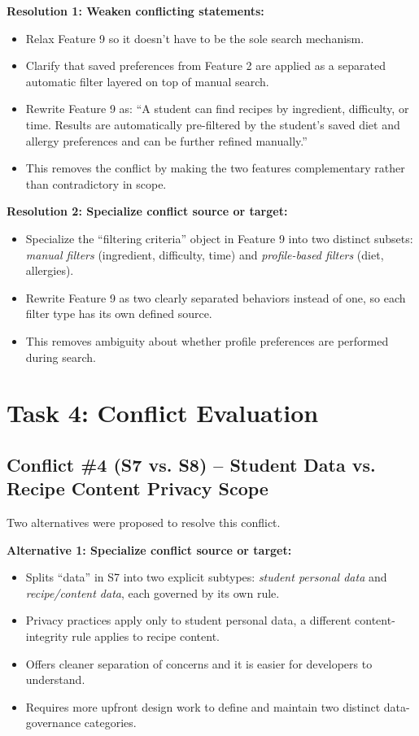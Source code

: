 \documentclass[11pt]{article}
\begin{document}
\textbf{Resolution 1: Weaken conflicting statements:}
\begin{itemize}[leftmargin=1.5em]
  \item Relax Feature 9 so it doesn't have to be the sole search mechanism.
  \item Clarify that saved preferences from Feature 2 are applied as a separated automatic filter layered on top of manual search.
  \item Rewrite Feature 9 as: ``A student can find recipes by ingredient, difficulty, or time. Results are automatically pre-filtered by the student's saved diet and allergy preferences and can be further refined manually.''
  \item This removes the conflict by making the two features complementary rather than contradictory in scope.
\end{itemize}

\textbf{Resolution 2: Specialize conflict source or target:}
\begin{itemize}[leftmargin=1.5em]
  \item Specialize the ``filtering criteria'' object in Feature 9 into two distinct subsets: \textit{manual filters} (ingredient, difficulty, time) and \textit{profile-based filters} (diet, allergies).
  \item Rewrite Feature 9 as two clearly separated behaviors instead of one, so each filter type has its own defined source.
  \item This removes ambiguity about whether profile preferences are performed during search.
\end{itemize}

\section{Task 4: Conflict Evaluation}

\subsection*{Conflict \#4 (S7 vs. S8) -- Student Data vs. Recipe Content Privacy Scope}

Two alternatives were proposed to resolve this conflict.

\textbf{Alternative 1: Specialize conflict source or target:}
\begin{itemize}[leftmargin=1.5em]
  \item Splits ``data'' in S7 into two explicit subtypes: \textit{student personal data} and \textit{recipe/content data}, each governed by its own rule.
  \item Privacy practices apply only to student personal data, a different content-integrity rule applies to recipe content.
  \item Offers cleaner separation of concerns and it is easier for developers to understand.
  \item Requires more upfront design work to define and maintain two distinct data-governance categories.
\end{itemize}
\end{document}
